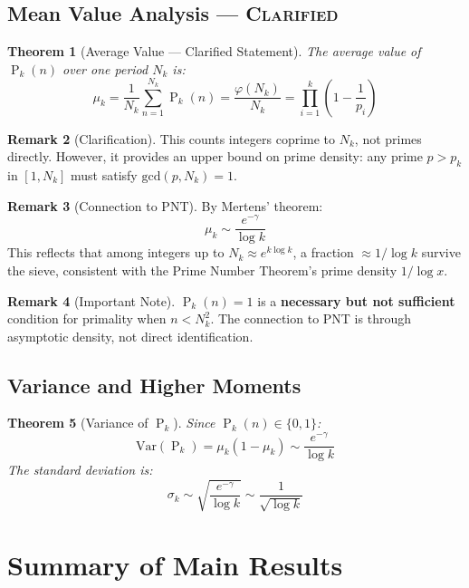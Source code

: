 ﻿\documentclass[12pt,a4paper]{report}
\theoremstyle{plain}
\newtheorem{theorem}{Theorem}[section]
\theoremstyle{definition}
\newtheorem{remark}[theorem]{Remark}
\newcommand{\Var}{\text{Var}}
\renewcommand{\gcd}{\text{gcd}}
\renewcommand{\phi}{\varphi}
\DeclareMathOperator{\Pk}{P}
\begin{document}
\section{Mean Value Analysis --- \textsc{Clarified}}

\begin{theorem}[Average Value --- Clarified Statement]
\label{thm:mean_value}
The average value of $\Pk_k(n)$ over one period $N_k$ is:
\[
\mu_k = \frac{1}{N_k}\sum_{n=1}^{N_k} \Pk_k(n) = \frac{\phi(N_k)}{N_k} = \prod_{i=1}^k \left(1 - \frac{1}{p_i}\right)
\]
\end{theorem}

\begin{remark}[Clarification]
This counts integers coprime to $N_k$, not primes directly. However, it provides an upper bound on prime density: any prime $p > p_k$ in $[1, N_k]$ must satisfy $\gcd(p, N_k) = 1$.
\end{remark}

\begin{remark}[Connection to PNT]
By Mertens' theorem:
\[
\mu_k \sim \frac{e^{-\gamma}}{\log k}
\]
This reflects that among integers up to $N_k \approx e^{k\log k}$, a fraction $\approx 1/\log k$ survive the sieve, consistent with the Prime Number Theorem's prime density $1/\log x$.
\end{remark}

\begin{remark}[Important Note]
$\Pk_k(n) = 1$ is a \textbf{necessary but not sufficient} condition for primality when $n < N_k^2$. The connection to PNT is through asymptotic density, not direct identification.
\end{remark}

\section{Variance and Higher Moments}

\begin{theorem}[Variance of $\Pk_k$]
\label{thm:variance}
Since $\Pk_k(n) \in \{0,1\}$:
\[
\Var(\Pk_k) = \mu_k(1-\mu_k) \sim \frac{e^{-\gamma}}{\log k}
\]
The standard deviation is:
\[
\sigma_k \sim \sqrt{\frac{e^{-\gamma}}{\log k}} \sim \frac{1}{\sqrt{\log k}}
\]
\end{theorem}

\chapter{Summary of Main Results}
\label{ch:summary}
\end{document}

